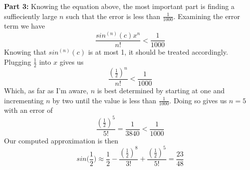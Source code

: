 \documentclass[12pt, letterpaper]{article}
\begin{document}
\textbf{Part 3:}
  Knowing the equation above, the most important part is finding a suffieciently large $n$ such that the error is less than $\frac{1}{1000}$.
  Examining the error term we have
  $$ \frac{sin^{(n)}(c)x^n}{n!} < \frac{1}{1000}$$
  Knowing that $sin^{(n)}(c)$ is at most 1, it should be treated accordingly. Plugging $\frac{1}{2}$ into $x$ gives us
  $$ \frac{(\frac{1}{2})^n}{n!} < \frac{1}{1000}$$
  Which, as far as I'm aware, $n$ is best determined by starting at one and incrementing $n$ by two until the value is less than $\frac{1}{1000}$. Doing so gives us $n = 5$ with an error of
  $$ \frac{(\frac{1}{2})^5}{5!} = \frac{1}{3840} < \frac{1}{1000} $$
  Our computed approximation is then
  $$ sin\Big(\frac{1}{2}\Big) \approx \frac{1}{2} - \frac{(\frac{1}{2})^8}{3!} + \frac{(\frac{1}{2})^5}{5!} = \frac{23}{48} $$
\end{document}
